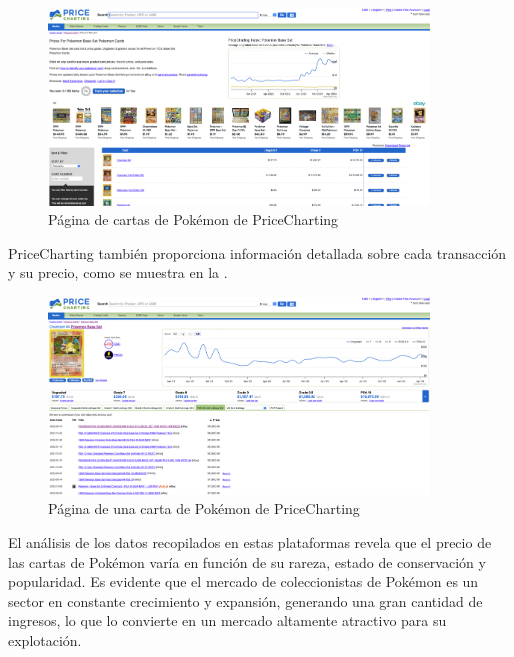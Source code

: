 \begin{figure}[H]
    \centering
    \includegraphics[width=0.9\textwidth]{figures/4-Estudio-viabilidad/4_PriceCharting.png}
    \caption{Página de cartas de Pokémon de PriceCharting}
    \label{fig:pricecharting}
    \hypertarget{fig:pricecharting}{}
\end{figure}

PriceCharting también proporciona información detallada sobre cada transacción y su precio, como se muestra en la .

\begin{figure}[H]
    \centering
    \includegraphics[width=0.9\textwidth]{figures/4-Estudio-viabilidad/4_PriceCharting2.png}
    \caption{Página de una carta de Pokémon de PriceCharting}
    \label{fig:pricecharting2}
    \hypertarget{fig:pricecharting2}{}
\end{figure}

El análisis de los datos recopilados en estas plataformas revela que el precio de las cartas de Pokémon varía en función de su rareza, estado de conservación y popularidad. 
Es evidente que el mercado de coleccionistas de Pokémon es un sector en constante crecimiento y expansión, generando una gran cantidad de ingresos, 
lo que lo convierte en un mercado altamente atractivo para su explotación.
